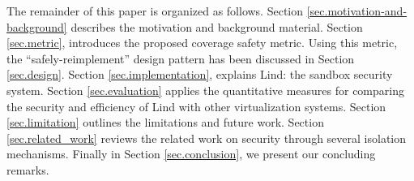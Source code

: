 The remainder of this paper is organized as follows. 
Section \ref{sec.motivation-and-background} describes the motivation and background material. 
Section \ref{sec.metric}, introduces the proposed coverage safety metric. Using this metric, the 
``safely-reimplement'' design pattern has been discussed in Section \ref{sec.design}. Section \ref{sec.implementation}, 
explains Lind: the sandbox security system. Section \ref{sec.evaluation} applies the quantitative measures for comparing 
the security and efficiency of Lind with other virtualization systems. Section \ref{sec.limitation} outlines the limitations and future work. 
Section \ref{sec.related_work} reviews the related work on security through several isolation mechanisms. 
Finally in Section \ref{sec.conclusion}, we present our concluding remarks.